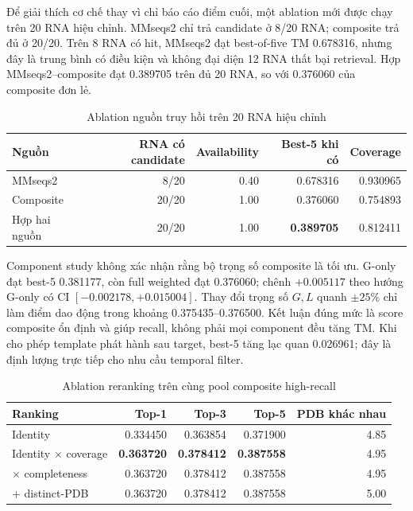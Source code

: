 \documentclass[12pt,a4paper,oneside]{report}
\begin{document}
Để giải thích cơ chế thay vì chỉ báo cáo điểm cuối, một ablation mới được chạy trên 20
RNA hiệu chỉnh. MMseqs2 chỉ trả candidate ở 8/20 RNA; composite trả đủ ở 20/20. Trên
8 RNA có hit, MMseqs2 đạt best-of-five TM 0.678316, nhưng đây là trung bình có điều
kiện và không đại diện 12 RNA thất bại retrieval. Hợp MMseqs2--composite đạt 0.389705
trên đủ 20 RNA, so với 0.376060 của composite đơn lẻ.

\begin{table}[H]
\centering
\caption{Ablation nguồn truy hồi trên 20 RNA hiệu chỉnh}
\begin{tabular}{lrrrr}
\toprule
Nguồn & RNA có candidate & Availability & Best-5 khi có & Coverage\\
\midrule
MMseqs2 & 8/20 & 0.40 & 0.678316 & 0.930965\\
Composite & 20/20 & 1.00 & 0.376060 & 0.754893\\
Hợp hai nguồn & 20/20 & 1.00 & \textbf{0.389705} & 0.812411\\
\bottomrule
\end{tabular}
\end{table}

Component study không xác nhận rằng bộ trọng số composite là tối ưu. G-only đạt best-5
0.381177, còn full weighted đạt 0.376060; chênh $+0.005117$ theo hướng G-only có CI
$[-0.002178,+0.015004]$. Thay đổi trọng số $G,L$ quanh $\pm25\%$ chỉ làm điểm dao động
trong khoảng 0.375435--0.376500. Kết luận đúng mức là score composite ổn định và giúp
recall, không phải mọi component đều tăng TM. Khi cho phép template phát hành sau target,
best-5 tăng lạc quan 0.026961; đây là định lượng trực tiếp cho nhu cầu temporal filter.

\begin{table}[H]
\centering
\caption{Ablation reranking trên cùng pool composite high-recall}
\begin{tabular}{lrrrr}
\toprule
Ranking & Top-1 & Top-3 & Top-5 & PDB khác nhau\\
\midrule
Identity & 0.334450 & 0.363854 & 0.371900 & 4.85\\
Identity $\times$ coverage & \textbf{0.363720} & \textbf{0.378412} & \textbf{0.387558} & 4.95\\
$\times$ completeness & 0.363720 & 0.378412 & 0.387558 & 4.95\\
+ distinct-PDB & 0.363720 & 0.378412 & 0.387558 & 5.00\\
\bottomrule
\end{tabular}
\end{table}
\end{document}
